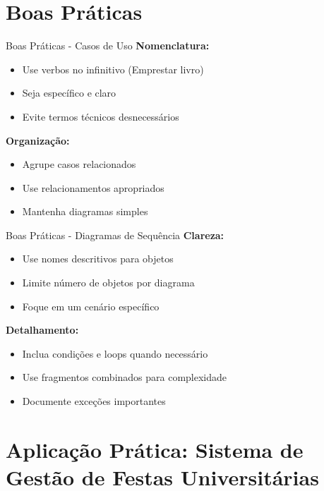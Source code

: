 \documentclass[aspectratio=169]{beamer}
\begin{document}
\section{Boas Práticas}

\begin{frame}{Boas Práticas - Casos de Uso}
\textbf{Nomenclatura:}
\begin{itemize}
\item Use verbos no infinitivo (Emprestar livro)
\item Seja específico e claro
\item Evite termos técnicos desnecessários
\end{itemize}

\vspace{0.5cm}
\textbf{Organização:}
\begin{itemize}
\item Agrupe casos relacionados
\item Use relacionamentos apropriados
\item Mantenha diagramas simples
\end{itemize}
\end{frame}

\begin{frame}{Boas Práticas - Diagramas de Sequência}
\textbf{Clareza:}
\begin{itemize}
\item Use nomes descritivos para objetos
\item Limite número de objetos por diagrama
\item Foque em um cenário específico
\end{itemize}

\vspace{0.5cm}
\textbf{Detalhamento:}
\begin{itemize}
\item Inclua condições e loops quando necessário
\item Use fragmentos combinados para complexidade
\item Documente exceções importantes
\end{itemize}
\end{frame}

\section{Aplicação Prática: Sistema de Gestão de Festas Universitárias}
\end{document}
